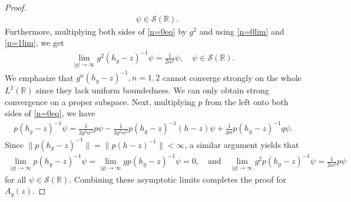 \documentclass[10pt,a4paper]{amsart}
\newcommand{\RR}{\mathbb{R}}
\begin{document}
\begin{proof}
\begin{align}
    \quad 
    \psi \in {\mathscr S}(\RR).
\end{align}
Furthermore, multiplying both sides of \eqref{n=0eq} by $g^2$ and using \eqref{n=0lim} and \eqref{n=1lim}, we get
\begin{align*}
    \lim_{|g|\to\infty} g^2 (h_g - z)^{-1} \psi = \frac{1}{2\alpha^2} \psi, 
    \quad 
    \psi \in {\mathscr S}(\RR).
\end{align*}
We emphasize that $g^n (h_g - z)^{-1}, n = 1, 2$ cannot converge strongly on the whole $L^2(\RR)$ since they lack uniform boundedness. We can only obtain strong convergence on a proper subspace. Next, multiplying $p$ from the left onto both sides of \eqref{n=0eq}, we have
\begin{align*}
    p (h_g - z)^{-1} \psi
    = \frac{1}{2g^2\alpha^2} p\psi 
    - \frac{1}{2g^2\alpha^2} p (h_g - z)^{-1} (h - z) \psi
    + \frac{1}{g\alpha} p (h_g - z)^{-1} q\psi.
\end{align*}
Since $\| p (h_g - z)^{-1} \| = \| p (h - z)^{-1} \| < \infty$, a similar argument yields that
\begin{align*}
    \lim_{|g|\to\infty} p (h_g - z)^{-1} \psi = \lim_{|g|\to\infty} g p (h_g - z)^{-1} \psi = 0, 
    \quad \text{and} \quad
    \lim_{|g|\to\infty} g^2 p (h_g - z)^{-1} \psi = \frac{1}{2\alpha^2} p\psi
\end{align*}
for all $\psi \in {\mathscr S}(\RR)$. Combining these asymptotic limits completes the proof for $A_g(z)$.
\end{proof}
\end{document}

